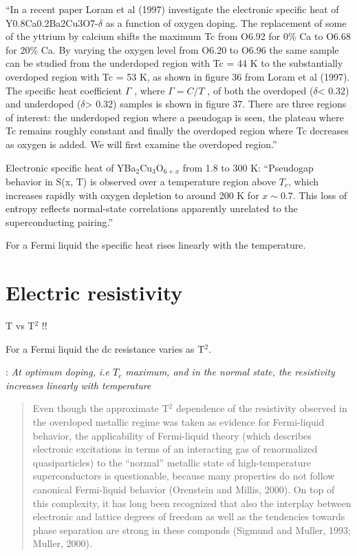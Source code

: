 ``In a recent paper Loram et al (1997) \cite{Loram1997} investigate the electronic specific heat of
Y0.8Ca0.2Ba2Cu3O7-$\delta$ as a function of oxygen doping. The replacement of some of the yttrium by calcium shifts the maximum Tc from O6.92 for 0\% Ca to O6.68 for 20\% Ca. By varying
the oxygen level from O6.20 to O6.96 the same sample can be studied from the underdoped
region with Tc = 44 K to the substantially overdoped region with Tc = 53 K, as shown in figure 36 from Loram et al (1997). The specific heat coefficient $\Gamma$ , where $\Gamma = C/T$ , of both the overdoped ($\delta$< 0.32) and underdoped ($\delta$> 0.32) samples is shown in figure 37. There are three regions of interest: the underdoped region where a pseudogap is seen, the plateau where
Tc remains roughly constant and finally the overdoped region where Tc decreases as oxygen is added. We will first examine the overdoped region.'' \cite{Timusk1999}

Electronic specific heat of YBa$_2$Cu$_3$O$_{6+x}$ from 1.8 to 300 K: \cite{Loram1993, Loram1994} ``Pseudogap behavior in S(x, T) is observed over a temperature region above $T_c$, which increases rapidly with oxygen depletion to around 200 K for $x\sim 0.7$. This loss of entropy reflects normal-state correlations apparently unrelated to the superconducting pairing.''

For a Fermi liquid the specific heat rises linearly with the temperature.

\section{Electric resistivity}
\label{sec:resistivity}

T vs T$^2$ \cite{Timusk1999}!!

For a Fermi liquid the dc resistance varies as T$^2$.

\cite{Muller2007}: \textit{At optimum doping, i.e $T_c$ maximum, and in the normal state, the resistivity increases linearly with temperature}

\cite{Damascelli2003}
\begin{quote}
Even though the approximate T$^2$ dependence of the resistivity observed in the overdoped metallic regime was taken as evidence for Fermi-liquid behavior, the applicability of Fermi-liquid theory (which describes electronic excitations in terms of an interacting gas of renormalized quasiparticles) to the ``normal'' metallic state of high-temperature superconductors is questionable, because many properties do not follow canonical Fermi-liquid behavior (Orenstein and Millis, 2000).
On top of this complexity, it has long been recognized that also the interplay between electronic and lattice degrees of freedom as well as the tendencies towards phase separation are strong in these componds (Sigmund and Muller, 1993; Muller, 2000). 
\end{quote}



